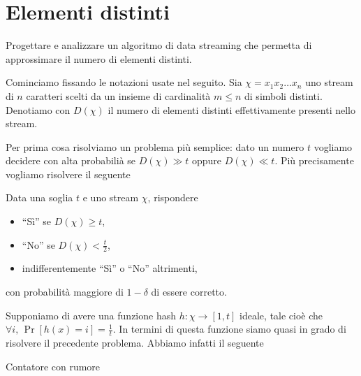 \chapter{Elementi distinti}

\begin{problem*}
    Progettare e analizzare un algoritmo di data streaming che permetta di
    approssimare il numero di elementi distinti.
\end{problem*}

Cominciamo fissando le notazioni usate nel seguito. Sia \(\chi = x_1 x_2
\dots x_n\) uno stream di \(n\) caratteri scelti da un insieme di cardinalit\`a
\(m\le n\) di simboli distinti. Denotiamo con \(D(\chi)\) il numero di elementi
distinti effettivamente presenti nello stream.

Per prima cosa risolviamo un problema pi\`u semplice: dato un numero \(t\)
vogliamo decidere con alta probabili\`a se \(D(\chi) \gg t\) oppure \(D(\chi) \ll
t\). Pi\`u precisamente vogliamo risolvere il seguente
\begin{problem*}
  Data una soglia \(t\) e uno stream \(\chi\), rispondere
  \begin{itemize}
    \item ``S\`i'' se \(D(\chi)\ge t\),
    \item ``No'' se \(D(\chi)<\frac{t}{2}\),
    \item indifferentemente ``S\`i'' o ``No'' altrimenti,
  \end{itemize}
  con probabilit\`a maggiore di \(1 - \delta\) di essere corretto.
\end{problem*}

Supponiamo di avere una funzione hash \(h:\chi\rightarrow [1,t]\) ideale, tale
cio\`e che \(\forall i\mbox{, }\Pr[h(x)=i]=\frac{1}{t}\). In termini di
questa funzione siamo quasi in grado di risolvere il precedente problema.
Abbiamo infatti il seguente
\begin{algorithm}
  \caption{Contatore con rumore}
  \begin{algorithmic}[1]
        \State {}
      \EndIf
    \EndFor
    \State {}
    \EndFunction
  \end{algorithmic}
\end{algorithm}

